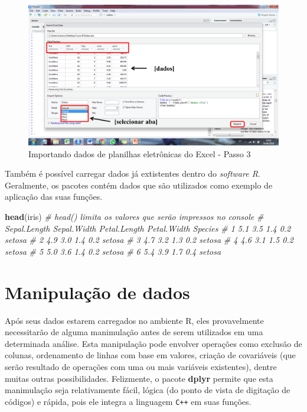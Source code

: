 \documentclass[
]{book}
\newenvironment{Shaded}{\begin{snugshade}}{\end{snugshade}}
\newcommand{\CommentTok}[1]{\textcolor[rgb]{0.56,0.35,0.01}{\textit{#1}}}
\newcommand{\KeywordTok}[1]{\textcolor[rgb]{0.13,0.29,0.53}{\textbf{#1}}}
\newcommand{\NormalTok}[1]{#1}
\begin{document}
\begin{figure}
\centering
\includegraphics{figures/Import2.png}
\caption{Importando dados de planilhas eletrônicas do Excel - Passo 3}
\end{figure}

Também é possível carregar dados já extistentes dentro do \emph{software R}. Geralmente, os pacotes contém dados que são utilizados como exemplo de aplicação das suas funções.

\begin{Shaded}
\begin{Highlighting}[]
\KeywordTok{head}\NormalTok{(iris) }\CommentTok{# head() limita os valores que serão impressos no console}
\CommentTok{#   Sepal.Length Sepal.Width Petal.Length Petal.Width Species}
\CommentTok{# 1          5.1         3.5          1.4         0.2  setosa}
\CommentTok{# 2          4.9         3.0          1.4         0.2  setosa}
\CommentTok{# 3          4.7         3.2          1.3         0.2  setosa}
\CommentTok{# 4          4.6         3.1          1.5         0.2  setosa}
\CommentTok{# 5          5.0         3.6          1.4         0.2  setosa}
\CommentTok{# 6          5.4         3.9          1.7         0.4  setosa}
\end{Highlighting}
\end{Shaded}

\hypertarget{manipula}{%
\chapter{Manipulação de dados}\label{manipula}}

Após seus dados estarem carregados no ambiente R, eles provavelmente necessitarão de alguma manimulação antes de serem utilizados em uma determinada análise. Esta manipulação pode envolver operações como exclusão de colunas, ordenamento de linhas com base em valores, criação de covariáveis (que serão resultado de operações com uma ou mais variáveis existentes), dentre muitas outras possibilidades. Felizmente, o pacote \textbf{dplyr}  permite que esta manimulação seja relativamente fácil, lógica (do ponto de vista de digitação de códigos) e rápida, pois ele integra a linguagem \texttt{C++} em suas funções.
\end{document}
